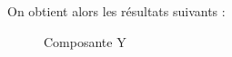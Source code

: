 \documentclass[french,a4paper,10pt]{article}
\begin{document}
    On obtient alors les résultats suivants :
    \begin{figure}[!htb]
        \begin{minipage}{0.3\textwidth}
            \centering
            \caption{Composante Y}\label{Fig:peppers_y}
        \end{minipage}\hfill
        \begin{minipage}{0.3\textwidth}
            \centering

\end{minipage}
\end{figure}
\end{document}
